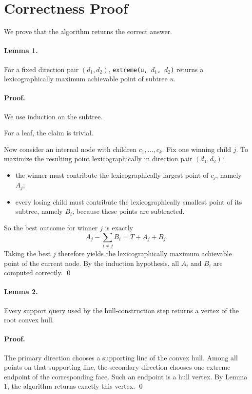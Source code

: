\documentclass[11pt]{article}
\begin{document}
\section*{Correctness Proof}

We prove that the algorithm returns the correct answer.

\paragraph{Lemma 1.}
For a fixed direction pair $(d_1,d_2)$, \texttt{extreme(u, $d_1$, $d_2$)} returns a lexicographically
maximum achievable point of subtree $u$.

\paragraph{Proof.}
We use induction on the subtree.

For a leaf, the claim is trivial.

Now consider an internal node with children $c_1,\dots,c_k$. Fix one winning child $j$. To maximize
the resulting point lexicographically in direction pair $(d_1,d_2)$:
\begin{itemize}[leftmargin=*]
    \item the winner must contribute the lexicographically largest point of $c_j$, namely $A_j$;
    \item every losing child must contribute the lexicographically smallest point of its subtree, namely
    $B_i$, because these points are subtracted.
\end{itemize}
So the best outcome for winner $j$ is exactly
\[
    A_j - \sum_{i \ne j} B_i = T + A_j + B_j.
\]
Taking the best $j$ therefore yields the lexicographically maximum achievable point of the current node.
By the induction hypothesis, all $A_i$ and $B_i$ are computed correctly. \qed

\paragraph{Lemma 2.}
Every support query used by the hull-construction step returns a vertex of the root convex hull.

\paragraph{Proof.}
The primary direction chooses a supporting line of the convex hull. Among all points on that supporting
line, the secondary direction chooses one extreme endpoint of the corresponding face. Such an endpoint is
a hull vertex. By Lemma 1, the algorithm returns exactly this vertex. \qed
\end{document}
